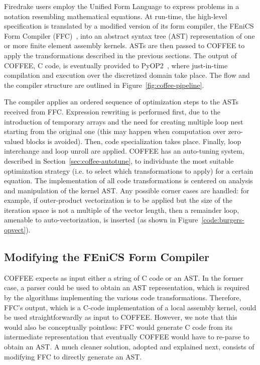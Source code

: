Firedrake users employ the Unified Form Language to express problems in a notation resembling mathematical equations. At run-time, the high-level specification is translated by a modified version of its form compiler, the FEniCS Form Compiler (FFC)~\cite{FFC-Compiler}, into an abstract syntax tree (AST) representation of one or more finite element assembly kernels. ASTs are then passed to COFFEE to apply the transformations described in the previous sections. The output of COFFEE, C code, is eventually provided to PyOP2~\citep{pyop2isc}, where just-in-time compilation and execution over the discretized domain take place. The flow and the compiler structure are outlined in Figure~\ref{fig:coffee-pipeline}. 

The compiler applies an ordered sequence of optimization steps to the ASTs received from FFC. Expression rewriting is performed first, due to the introduction of temporary arrays and the need for creating multiple loop nest starting from the original one (this may happen when computation over zero-valued blocks is avoided). Then, code specialization takes place. Finally, loop interchange and loop unroll are applied. COFFEE has an auto-tuning system, described in Section~\ref{sec:coffee-autotune}, to individuate the most suitable optimization strategy (i.e. to select which transformations to apply) for a certain equation. The implementation of all code transformations is centered on analysis and manipulation of the kernel AST. Any possible corner cases are handled: for example, if outer-product vectorization is to be applied but the size of the iteration space is not a multiple of the vector length, then a remainder loop, amenable to auto-vectorization, is inserted (as shown in Figure~\ref{code:burgers-opvect}).



\subsection{Modifying the FEniCS Form Compiler}
COFFEE expects as input either a string of C code or an AST. In the former case, a parser could be used to obtain an AST representation, which is required by the algorithms implementing the various code transformations. Therefore, FFC's output, which is a C-code implementation of a local assembly kernel, could be used straightforwardly as input to COFFEE. However, we note that this would also be conceptually pointless: FFC would generate C code from its intermediate representation that eventually COFFEE would have to re-parse to obtain an AST. A much cleaner solution, adopted and explained next, consists of modifying FFC to directly generate an AST. 

